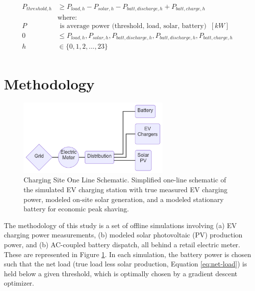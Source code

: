 \documentclass[journal,article,submit,pdftex,moreauthors]{Definitions/mdpi}
\begin{document}
\begin{equation}
  \label{eq:peakshaving}
  \begin{split}
    P_{threshold,h} & \ge P_{load,h} - P_{solar,h} - P_{batt,discharge,h} + P_{batt,charge,h}                     \\
                    & \text{where:}                                                                               \\
    P               & \text{ is average power (threshold, load, solar, battery) }\ [kW]                             \\
    0               & \le  P_{load,h}, P_{solar,h}, P_{batt,discharge,h}, P_{batt,discharge,h}, P_{batt,charge,h} \\
    h               & \in \{0,1,2,...,23\}                                                                        \\
  \end{split}
\end{equation}


\section{Methodology}\label{methodology}%

\begin{figure}
  \centering
  \includegraphics[width=7.5cm]{./images/oneline.png}
  \caption{Charging Site One Line Schematic. Simplified one-line schematic of the simulated EV charging station with true measured EV charging power, modeled on-site solar generation, and a modeled stationary battery for economic peak shaving.}
  \label{fig:oneline}
\end{figure}

The methodology of this study is a set of offline simulations involving (a) EV charging power measurements, (b) modeled solar photovoltaic (PV) production power, and (b) AC-coupled battery dispatch, all behind a retail electric meter. These are represented in Figure \ref{fig:oneline}. In each simulation, the battery power is chosen such that the net load (true load less solar production, Equation \ref{eq:net-load}) is held below a given threshold, which is optimally chosen by a gradient descent optimizer.
\end{document}
